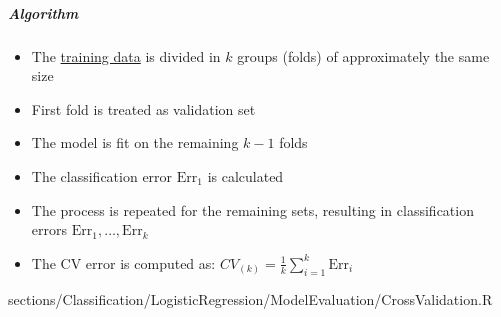 		\subparagraph{Algorithm}
			\RTheory
			{
				\begin{itemize}
				    \item The \underline{training data} is divided in $k$ groups (folds) of approximately the same size
				    \item First fold is treated as validation set
				    \item The model is fit on the remaining $k-1$ folds
				    \item The classification error $\mathrm{Err}_1$ is calculated
				    \item The process is repeated for the remaining sets, resulting in classification errors $\mathrm{Err}_1, \dots, \mathrm{Err}_k$
				    \item The CV error is computed as: $CV_{(k)} = \frac{1}{k} \sum\limits_{i=1}^k\mathrm{Err}_i$
				\end{itemize}
			}
			{
				sections/Classification/LogisticRegression/ModelEvaluation/CrossValidation.R
			}

		